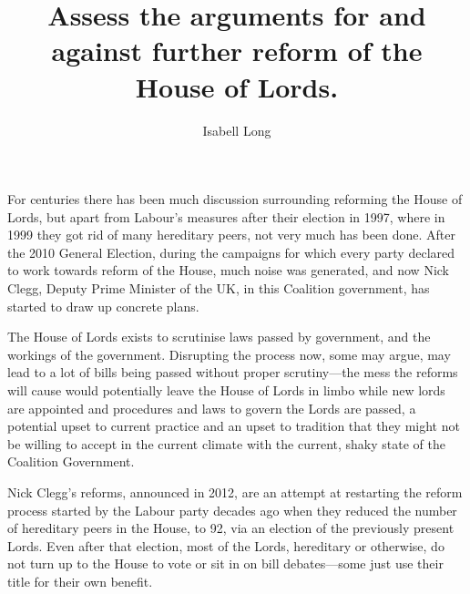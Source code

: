 \documentclass[a4paper]{article}
\begin{document}
\title{Assess the arguments for and against further reform of the House of
Lords.}
\author{Isabell Long}
\maketitle

For centuries there has been much discussion surrounding reforming the House of Lords, but apart from Labour's measures after their election in 1997, where in 1999 they got rid of many hereditary peers, not very much has been done.  After the 2010 General Election, during the campaigns for which every party declared to work towards reform of the House, much noise was generated, and now Nick Clegg, Deputy Prime Minister of the UK, in this Coalition government, has started to draw up concrete plans.

The House of Lords exists to scrutinise laws passed by government, and the workings of the government.  Disrupting the process now, some may argue, may lead to a lot of bills being passed without proper scrutiny---the mess the reforms will cause would potentially leave the House of Lords in limbo while new lords are appointed and procedures and laws to govern the Lords are passed, a potential upset to current practice and an upset to tradition that they might not be willing to accept in the current climate with the current, shaky state of the Coalition Government.

Nick Clegg's reforms, announced in 2012, are an attempt at restarting the reform process started by the Labour party decades ago when they reduced the number of hereditary peers in the House, to 92, via an election of the previously present Lords.  Even after that election, most of the Lords, hereditary or otherwise, do not turn up to the House to vote or sit in on bill debates---some just use their title for their own benefit.
\end{document}
